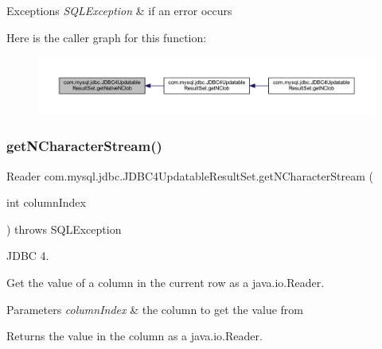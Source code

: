 \begin{DoxyExceptions}{Exceptions}
{\em S\+Q\+L\+Exception} & if an error occurs \\
\hline
\end{DoxyExceptions}
Here is the caller graph for this function\+:
\nopagebreak
\begin{figure}[H]
\begin{center}
\leavevmode
\includegraphics[width=350pt]{classcom_1_1mysql_1_1jdbc_1_1_j_d_b_c4_updatable_result_set_ada1fa51ea7ce43ee01de52ff5c0b4275_icgraph}
\end{center}
\end{figure}
\mbox{\label{classcom_1_1mysql_1_1jdbc_1_1_j_d_b_c4_updatable_result_set_a9abc20c9e184a65a0895a24ff6ce7c3c}} 
\subsubsection{\texorpdfstring{get\+N\+Character\+Stream()}{getNCharacterStream()}\hspace{0.1cm}{\footnotesize\ttfamily [1/2]}}
{\footnotesize\ttfamily Reader com.\+mysql.\+jdbc.\+J\+D\+B\+C4\+Updatable\+Result\+Set.\+get\+N\+Character\+Stream (\begin{DoxyParamCaption}\item[{int}]{column\+Index }\end{DoxyParamCaption}) throws S\+Q\+L\+Exception}

J\+D\+BC 4.

Get the value of a column in the current row as a java.\+io.\+Reader. 


\begin{DoxyParams}{Parameters}
{\em column\+Index} & the column to get the value from\\
\hline
\end{DoxyParams}
\begin{DoxyReturn}{Returns}
the value in the column as a java.\+io.\+Reader.
\end{DoxyReturn}

